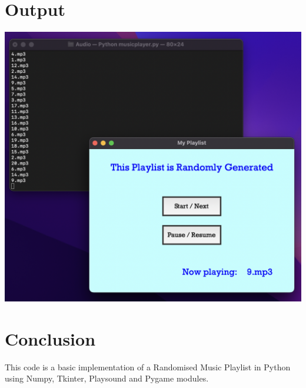 \documentclass[journal,12pt,twocolumn]{IEEEtran}
\begin{document}
\section{Output}
\includegraphics[scale=0.36]{images/Output.png}

\section{Conclusion}
This code is a basic implementation of a Randomised Music Playlist in Python using Numpy, Tkinter, Playsound and Pygame modules.
\end{document}
